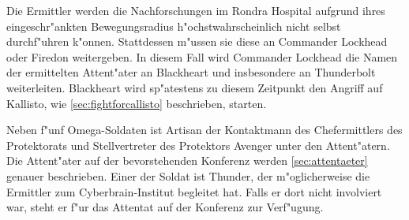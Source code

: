 Die Ermittler werden die Nachforschungen im Rondra Hospital aufgrund ihres eingeschr"ankten Bewegungsradius h"ochstwahrscheinlich nicht selbst durchf"uhren k"onnen. Stattdessen m"ussen sie diese an Commander Lockhead oder Firedon weitergeben. In diesem Fall wird Commander Lockhead die Namen der ermittelten Attent"ater an Blackheart und insbesondere an Thunderbolt weiterleiten. Blackheart wird sp"atestens zu diesem Zeitpunkt den Angriff auf Kallisto, wie \cref{sec:fightforcallisto} beschrieben, starten.

Neben f"unf Omega-Soldaten ist Artisan der Kontaktmann des Chefermittlers des Protektorats und Stellvertreter des Protektors Avenger unter den Attent"atern. Die Attent"ater auf der bevorstehenden Konferenz werden \cref{sec:attentaeter} genauer beschrieben. Einer der Soldat ist Thunder, der m"oglicherweise die Ermittler zum Cyberbrain-Institut begleitet hat. Falls er dort nicht involviert war, steht er f"ur das Attentat auf der Konferenz zur Verf"ugung.
